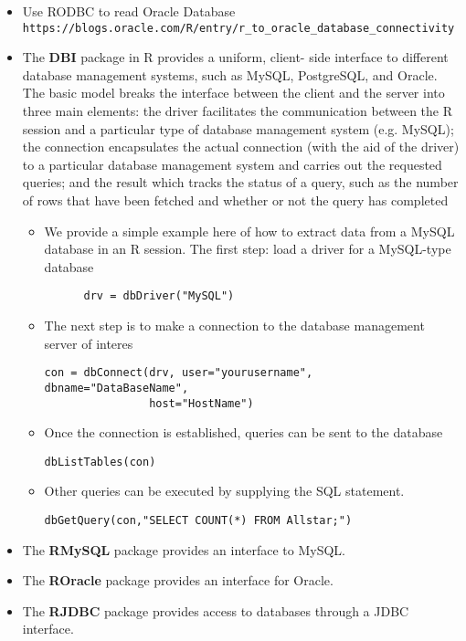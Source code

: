 \documentclass[10pt]{beamer}
\begin{document}
\begin{frame}
\begin{itemize}
  \item Use RODBC to read Oracle
    Database \texttt{https://blogs.oracle.com/R/entry/r\_to\_oracle\_database\_connectivity}

  \item The \textbf{DBI} package in R provides a uniform, client- side interface to
    different database management systems, such as MySQL, PostgreSQL, and Oracle. The
    basic model breaks the interface between the client and the server into three main
    elements: the driver facilitates the communication between the R session and a
    particular type of database management system (e.g. MySQL); the connection
    encapsulates the actual connection (with the aid of the driver) to a particular
    database management system and carries out the requested queries; and the result which
    tracks the status of a query, such as the number of rows that have been fetched and
    whether or not the query has completed

    \begin{itemize}
    \item We provide a simple example here of how to extract data from a MySQL database in
      an R session. The first step: load a driver for a MySQL-type database

\begin{verbatim}
      drv = dbDriver("MySQL")
\end{verbatim}

    \item The next step is to make a connection to the database management server of
      interes
\begin{verbatim}
con = dbConnect(drv, user="yourusername", dbname="DataBaseName",
                host="HostName")
\end{verbatim}

\item Once the connection is established, queries can be sent to the database

\begin{verbatim}
dbListTables(con)
\end{verbatim}

\item Other queries can be executed by supplying the SQL statement.

\begin{verbatim}
dbGetQuery(con,"SELECT COUNT(*) FROM Allstar;")
\end{verbatim}

    \end{itemize}


  \item The \textbf{RMySQL} package provides an interface to MySQL.

  \item The \textbf{ROracle} package provides an interface for Oracle.

  \item The \textbf{RJDBC} package provides access to databases through a JDBC interface.

  \end{itemize}
\end{frame}
\end{document}
